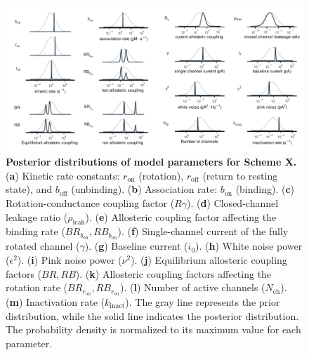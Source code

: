 \documentclass[pdflatex,sn-mathphys-num]{sn-jnl}%
\theoremstyle{thmstyleone}%
\theoremstyle{thmstyletwo}%
\theoremstyle{thmstylethree}%
\begin{document}
\begin{figure}[t]
	\centering
	\includegraphics[width=\linewidth]{Figure_2.pdf}
	\caption{\textbf{Posterior distributions of model parameters for Scheme X.}  
		(\textbf{a}) Kinetic rate constants: \(r_{\text{on}}\) (rotation), \(r_{\text{off}}\) (return to resting state), and \(b_{\text{off}}\) (unbinding).  
		(\textbf{b}) Association rate: \(b_{\text{on}}\) (binding).  
		(\textbf{c}) Rotation-conductance coupling factor (\(R\gamma\)).  
		(\textbf{d}) Closed-channel leakage ratio (\(\rho_{\text{leak}}\)).  
		(\textbf{e}) Allosteric coupling factor affecting the binding rate (\(BR_{b_{\text{on}}}, RB_{b_{\text{on}}}\)).  
		(\textbf{f}) Single-channel current of the fully rotated channel (\(\gamma\)).  
		(\textbf{g}) Baseline current (\(i_0\)).  
		(\textbf{h}) White noise power (\(\epsilon^2\)).  
		(\textbf{i}) Pink noise power (\(\nu^2\)).  
		(\textbf{j}) Equilibrium allosteric coupling factors (\(BR, RB\)).  
		(\textbf{k}) Allosteric coupling factors affecting the rotation rate (\(BR_{r_{\text{on}}}, RB_{r_{\text{on}}}\)).  
		(\textbf{l}) Number of active channels (\(N_{\text{ch}}\)).  
		(\textbf{m}) Inactivation rate (\(k_{\text{inact}}\)).  
		The gray line represents the prior distribution, while the solid line indicates the posterior distribution. The probability density is normalized to its maximum value for each parameter.
	}
	\label{fig:posterior_SchemeX}
\end{figure}
\end{document}

